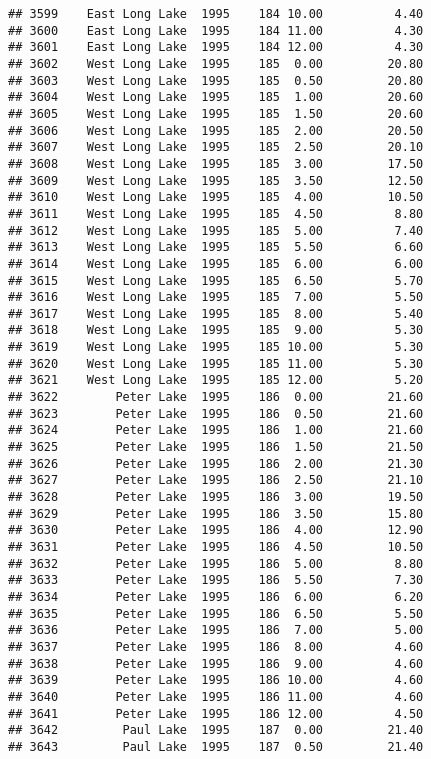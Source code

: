 \documentclass[
]{article}
\begin{document}
\begin{verbatim}
## 3599    East Long Lake  1995    184 10.00          4.40
## 3600    East Long Lake  1995    184 11.00          4.30
## 3601    East Long Lake  1995    184 12.00          4.30
## 3602    West Long Lake  1995    185  0.00         20.80
## 3603    West Long Lake  1995    185  0.50         20.80
## 3604    West Long Lake  1995    185  1.00         20.60
## 3605    West Long Lake  1995    185  1.50         20.60
## 3606    West Long Lake  1995    185  2.00         20.50
## 3607    West Long Lake  1995    185  2.50         20.10
## 3608    West Long Lake  1995    185  3.00         17.50
## 3609    West Long Lake  1995    185  3.50         12.50
## 3610    West Long Lake  1995    185  4.00         10.50
## 3611    West Long Lake  1995    185  4.50          8.80
## 3612    West Long Lake  1995    185  5.00          7.40
## 3613    West Long Lake  1995    185  5.50          6.60
## 3614    West Long Lake  1995    185  6.00          6.00
## 3615    West Long Lake  1995    185  6.50          5.70
## 3616    West Long Lake  1995    185  7.00          5.50
## 3617    West Long Lake  1995    185  8.00          5.40
## 3618    West Long Lake  1995    185  9.00          5.30
## 3619    West Long Lake  1995    185 10.00          5.30
## 3620    West Long Lake  1995    185 11.00          5.30
## 3621    West Long Lake  1995    185 12.00          5.20
## 3622        Peter Lake  1995    186  0.00         21.60
## 3623        Peter Lake  1995    186  0.50         21.60
## 3624        Peter Lake  1995    186  1.00         21.60
## 3625        Peter Lake  1995    186  1.50         21.50
## 3626        Peter Lake  1995    186  2.00         21.30
## 3627        Peter Lake  1995    186  2.50         21.10
## 3628        Peter Lake  1995    186  3.00         19.50
## 3629        Peter Lake  1995    186  3.50         15.80
## 3630        Peter Lake  1995    186  4.00         12.90
## 3631        Peter Lake  1995    186  4.50         10.50
## 3632        Peter Lake  1995    186  5.00          8.80
## 3633        Peter Lake  1995    186  5.50          7.30
## 3634        Peter Lake  1995    186  6.00          6.20
## 3635        Peter Lake  1995    186  6.50          5.50
## 3636        Peter Lake  1995    186  7.00          5.00
## 3637        Peter Lake  1995    186  8.00          4.60
## 3638        Peter Lake  1995    186  9.00          4.60
## 3639        Peter Lake  1995    186 10.00          4.60
## 3640        Peter Lake  1995    186 11.00          4.60
## 3641        Peter Lake  1995    186 12.00          4.50
## 3642         Paul Lake  1995    187  0.00         21.40
## 3643         Paul Lake  1995    187  0.50         21.40

\end{verbatim}
\end{document}
